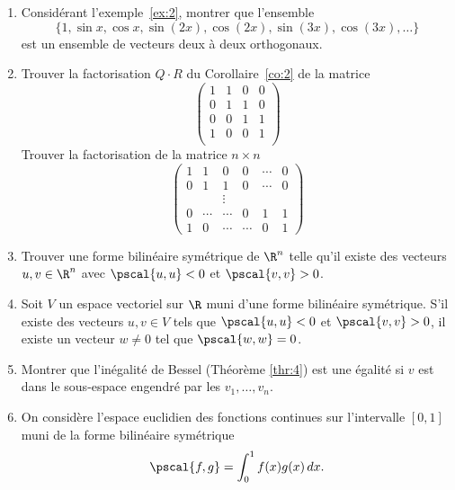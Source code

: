 \begin{enumerate}
\item Considérant l'exemple~\ref{ex:2}, montrer que l'ensemble 
  \begin{displaymath}
    \{1,\sin x, \cos x, \sin(2x), \cos(2x), \sin(3x), \cos(3x), \dots\}
  \end{displaymath}
 est un ensemble de 
vecteurs deux à deux orthogonaux. 
\item Trouver la factorisation $Q\cdot R$  du Corollaire~\ref{co:2} de la matrice 
  \begin{displaymath}
    \begin{pmatrix}
      1 & 1 & 0 &0 \\
      0& 1 & 1 & 0\\
      0 & 0 & 1 & 1\\
      1 & 0 & 0 & 1\\
    \end{pmatrix}
  \end{displaymath}
  Trouver la factorisation de la matrice $n\times n$ 
  \begin{displaymath}
    \begin{pmatrix}
      1 & 1 & 0 & 0 & \cdots & 0\\
      0 & 1 & 1 & 0 & \cdots & 0 \\
      && \vdots &&\\
      0 & \cdots & \cdots&0& 1 & 1\\
      1 & 0 & \cdots &\cdots & 0 & 1
    \end{pmatrix}
  \end{displaymath}
\item Trouver une forme bilinéaire symétrique de $\R^n$ telle qu'il existe des vecteurs $u,v \in \R^n$ avec $\pscal{u,u}<0$ et $\pscal{v,v}>0$. 
\item Soit $V$ un espace vectoriel sur $\R$ muni d'une forme bilinéaire symétrique. S'il existe des vecteurs $u,v \in V$ tels que $\pscal{u,u}<0$ et $\pscal{v,v}>0$, il existe un vecteur $w \neq 0$ tel que $\pscal{w,w}=0$. 
\item Montrer que l'inégalité de Bessel (Théorème \ref{thr:4}) est une égalité si $v$ est dans le sous-espace engendré par les $v_1,\dots,v_n$. 
\item On considère l'espace euclidien des fonctions continues sur l'intervalle $[0,1]$ muni de la forme bilinéaire symétrique 
  \begin{displaymath}
    \pscal{f,g} = \int_0^1 f(x)g(x) \, dx. 
  \end{displaymath}
  \begin{enumerate}[i)]

\end{enumerate}
\end{enumerate}
